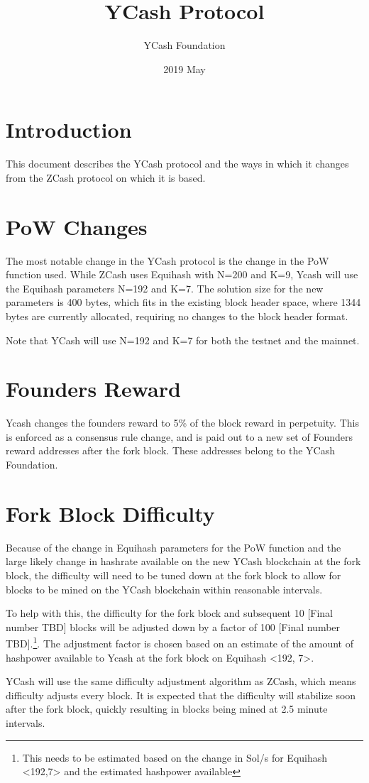 \documentclass{article}
\title{YCash Protocol}
\date{2019 May}
\author{YCash Foundation}
\begin{document}
\maketitle

\section{Introduction}
This document describes the YCash protocol and the ways in which it changes from the ZCash protocol on which it is based. 

\section{PoW Changes}
The most notable change in the YCash protocol is the change in the PoW function used. While ZCash uses Equihash with N=200 and K=9, Ycash will use the Equihash parameters N=192 and K=7. The solution size for the new parameters is 400 bytes, which fits in the existing block header space, where 1344 bytes are currently allocated, requiring no changes to the block header format. 
\par 
Note that YCash will use N=192 and K=7 for both the testnet and the mainnet.

\section{Founders Reward}
Ycash changes the founders reward to 5\% of the block reward in perpetuity. This is enforced as a consensus rule change, and is paid out to a new set of Founders reward addresses after the fork block. These addresses belong to the YCash Foundation.

\section{Fork Block Difficulty}
Because of the change in Equihash parameters for the PoW function and the large likely change in hashrate available on the new YCash blockchain at the fork block, the difficulty will need to be tuned down at the fork block to allow for blocks to be mined on the YCash blockchain within reasonable intervals. 
\par
To help with this, the difficulty for the fork block and subsequent 10 [Final number TBD] blocks will be adjusted down by a factor of 100 [Final number TBD].\footnote{This needs to be estimated based on the change in Sol/s for Equihash <192,7> and the estimated hashpower available}. The adjustment factor is chosen based on an estimate of the amount of hashpower available to Ycash at the fork block on Equihash <192, 7>. 
\par
YCash will use the same difficulty adjustment algorithm as ZCash, which means difficulty adjusts every block. It is expected that the difficulty will stabilize soon after the fork block, quickly resulting in blocks being mined at 2.5 minute intervals.
\end{document}
